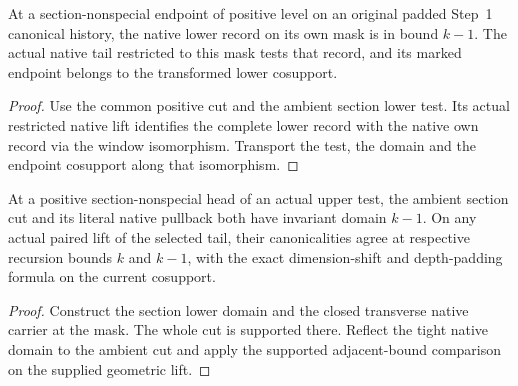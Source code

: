 \begin{theorem}
\label{hir:g1-positive-normal-own-tail-test}
\leanok
At a section-nonspecial endpoint of positive level on an original
padded Step~1 canonical history, the native lower record on its own
mask is in bound $k-1$. The actual native tail restricted to this
mask tests that record, and its marked endpoint belongs to the
transformed lower cosupport.
\end{theorem}
\begin{proof}
Use the common positive cut and the ambient section lower test. Its
actual restricted native lift identifies the complete lower record
with the native own record via the window isomorphism. Transport the
test, the domain and the endpoint cosupport along that isomorphism.
\end{proof}

\begin{theorem}
\label{hir:g1-positive-normal-section-domain}
\leanok
At a positive section-nonspecial head of an actual upper test, the
ambient section cut and its literal native pullback both have
invariant domain $k-1$. On any actual paired lift of the selected
tail, their canonicalities agree at respective recursion bounds $k$
and $k-1$, with the exact dimension-shift and depth-padding formula
on the current cosupport.
\end{theorem}
\begin{proof}
Construct the section lower domain and the closed transverse native
carrier at the mask. The whole cut is supported there. Reflect the
tight native domain to the ambient cut and apply the supported
adjacent-bound comparison on the supplied geometric lift.
\end{proof}

